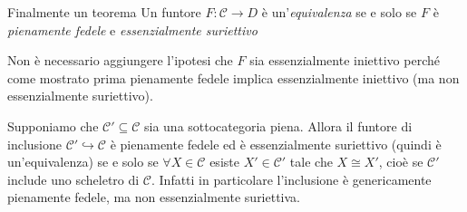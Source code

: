\begin{theorem}{Finalmente un teorema}
    Un funtore \(F : \mathcal{C} \to D\) è un'\emph{equivalenza} se e solo se \(F\) è \emph{pienamente fedele} e \emph{essenzialmente suriettivo}
\end{theorem}
\begin{remark}{}
    Non è necessario aggiungere l'ipotesi che \(F\) sia essenzialmente iniettivo
    perché come mostrato prima pienamente fedele implica essenzialmente
    iniettivo (ma non essenzialmente suriettivo).
\end{remark}
\begin{example}{}
    Supponiamo che \(\mathcal{C}' \subseteq \mathcal{C} \) sia una sottocategoria piena. Allora il
    funtore di inclusione \(\mathcal{C}' \hookrightarrow \mathcal{C}\) è pienamente fedele ed è
    essenzialmente suriettivo (quindi è un'equivalenza) se e solo se \(\forall X
    \in \mathcal{C}\) esiste \(X' \in \mathcal{C}'\) tale che \(X \cong X'\),
    cioè se \(\mathcal{C}'\) include uno scheletro di \(\mathcal{C}\). Infatti in
    particolare l'inclusione è genericamente pienamente fedele, ma non essenzialmente suriettiva.
\end{example}

